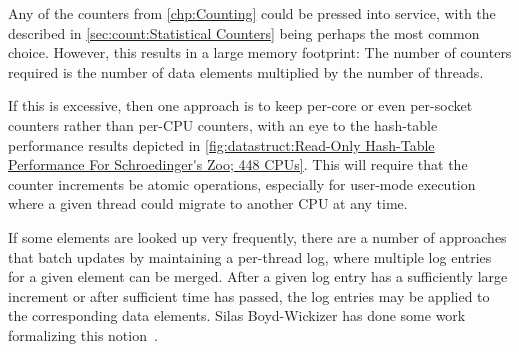 Any of the counters from \cref{chp:Counting}
could be pressed into service, with the  described in
\cref{sec:count:Statistical Counters} being perhaps the most common choice.
However, this results in a large memory footprint: The number of counters
required is the number of data elements multiplied by the number of
threads.

If this  is excessive, then one approach is to keep
per-core or even per-socket counters rather than per-CPU counters,
with an eye to the hash-table performance results depicted in
\cref{fig:datastruct:Read-Only Hash-Table Performance For Schroedinger's Zoo; 448 CPUs}.
This will require that the counter increments be atomic operations,
especially for user-mode execution where a given thread could migrate
to another CPU at any time.

If some elements are looked up very frequently, there are a number
of approaches that batch updates by maintaining a per-thread log,
where multiple log entries for a given element can be merged.
After a given log entry has a sufficiently large increment or after
sufficient time has passed, the log entries may be applied to the
corresponding data elements.
Silas Boyd-Wickizer has done some work formalizing this
notion~\cite{SilasBoydWickizerPhD}.
